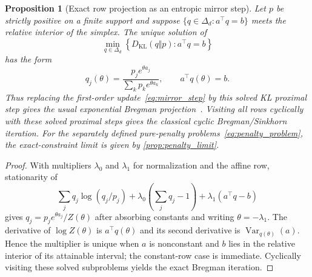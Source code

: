 \documentclass{article}
\newtheorem{proposition}{Proposition}[section]
\begin{document}
\begin{proposition}[Exact row projection as an entropic mirror step]\label{prop:sinkhorn_omd}
Let $p$ be strictly positive on a finite support and suppose $\{q\in\Delta_d:a^\top q=b\}$ meets the relative interior of the simplex.
The unique solution of
\[
\min_{q\in\Delta_d}\left\{D_{\mathrm{KL}}(q\Vert p):a^\top q=b\right\}
\]
has the form
\[
q_j(\theta)=\frac{p_j e^{\theta a_j}}{\sum_k p_k e^{\theta a_k}},
\qquad a^\top q(\theta)=b.
\]
Thus replacing the first-order update~\eqref{eq:mirror_step} by this solved KL proximal step gives the usual exponential Bregman projection~\citep{csiszar1975,bauschke1997}.
Visiting all rows cyclically with these solved proximal steps gives the classical cyclic Bregman/Sinkhorn iteration.
For the separately defined pure-penalty problems~\eqref{eq:penalty_problem}, the exact-constraint limit is given by \cref{prop:penalty_limit}.
\end{proposition}

\begin{proof}
With multipliers $\lambda_0$ and $\lambda_1$ for normalization and the affine row, stationarity of
\[
\sum_j q_j\log(q_j/p_j)+\lambda_0\left(\sum_jq_j-1\right)
+\lambda_1(a^\top q-b)
\]
gives $q_j=p_j e^{\theta a_j}/Z(\theta)$ after absorbing constants and writing $\theta=-\lambda_1$.
The derivative of $\log Z(\theta)$ is $a^\top q(\theta)$ and its second derivative is $\operatorname{Var}_{q(\theta)}(a)$.
Hence the multiplier is unique when $a$ is nonconstant and $b$ lies in the relative interior of its attainable interval; the constant-row case is immediate.
Cyclically visiting these solved subproblems yields the exact Bregman iteration.
\end{proof}
\end{document}
